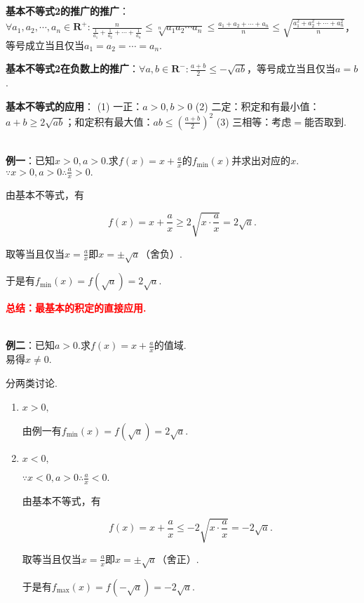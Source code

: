 \documentclass[8pt]{article}
\begin{document}
				\textbf{基本不等式2的推广的推广}：$\displaystyle \forall a_1, a_2, \cdots, a_n \in \mathbf{R}^{+}: \frac{n}{\frac{1}{a_1}+\frac{1}{a_2}+\cdots+\frac{1}{a_n}}\leq\sqrt[n]{a_1 a_2 \cdots a_n}\leq\frac{a_1+a_2+\cdots+a_n}{n}\leq\sqrt{\frac{a_1^2+a_2^2+\cdots+a_n^2}{n}}$，等号成立当且仅当$a_1=a_2=\cdots=a_n.$

				\textbf{基本不等式2在负数上的推广}：$\displaystyle \forall a, b \in \mathbf{R}^{-}: \frac{a+b}{2}\leq -\sqrt{ab}$，等号成立当且仅当$a=b$.

				\textbf{基本不等式的应用}： (1) 一正：$a>0, b>0$ (2) 二定：积定和有最小值：$a+b\geq2\sqrt{ab}$；和定积有最大值：$ab\leq\left(\frac{a+b}{2}\right)^2$ (3) 三相等：考虑$=$能否取到.

				~\\

				\textbf{例一}：已知$x>0, a>0$.求$f(x)=x+\frac{a}{x}$的$f_{\min}(x)$并求出对应的$x$.
					~\\

					$\because x>0, a>0 \therefore \frac{a}{x}>0.$

					由基本不等式，有

					$$f(x)=x+\frac{a}{x}\geq2\sqrt{x\cdot\frac{a}{x}}=2\sqrt{a}.$$

					取等当且仅当$x=\frac{a}{x}$即$x=\pm\sqrt{a}$（舍负）.

					于是有$f_{\min}(x)=f(\sqrt{a})=2\sqrt{a}.$

					\textcolor{red}{\textbf{总结：最基本的积定的直接应用.}}

				~\\

				\textbf{例二}：已知$a>0$.求$f(x)=x+\frac{a}{x}$的值域.
					~\\

					易得$x\neq0$.

					分两类讨论.

					\begin{enumerate}[label=$\arabic*^{\circ}$]
						\item
							$x>0,$

							由例一有$f_{\min}(x)=f(\sqrt{a})=2\sqrt{a}.$

						\item
							$x<0,$

							$\because x<0, a>0 \therefore \frac{a}{x}<0.$

							由基本不等式，有

							$$f(x)=x+\frac{a}{x}\leq-2\sqrt{x\cdot\frac{a}{x}}=-2\sqrt{a}.$$

							取等当且仅当$x=\frac{a}{x}$即$x=\pm\sqrt{a}$（舍正）.

							于是有$f_{\max}(x)=f(-\sqrt{a})=-2\sqrt{a}.$

					\end{enumerate}
\end{document}
